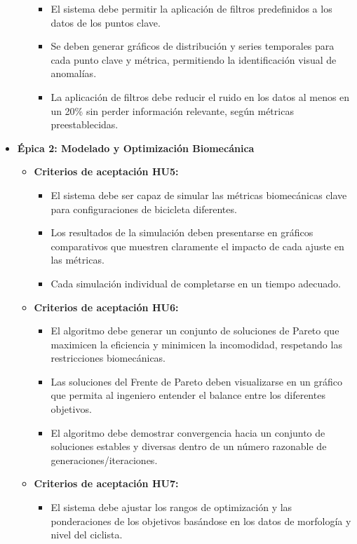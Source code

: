 \documentclass[
11pt, %
]{charter}
\begin{document}
\begin{itemize}
\begin{itemize}
\begin{itemize}
          \item El sistema debe permitir la aplicación de filtros predefinidos a los datos de los puntos clave. 
          \item Se deben generar gráficos de distribución y series temporales para cada punto clave y métrica, permitiendo la identificación visual de anomalías.
          \item La aplicación de filtros debe reducir el ruido en los datos al menos en un 20\% sin perder información relevante, según métricas preestablecidas.
        \end{itemize}
    \end{itemize}
  \item \textbf{Épica 2: Modelado y Optimización Biomecánica}
    \begin{itemize}
      \item \textbf{Criterios de aceptación HU5:}
        \begin{itemize}
          \item El sistema debe ser capaz de simular las métricas biomecánicas clave para configuraciones de bicicleta diferentes.
          \item Los resultados de la simulación deben presentarse en gráficos comparativos que muestren claramente el impacto de cada ajuste en las métricas.
          \item Cada simulación individual de completarse en un tiempo adecuado.
        \end{itemize}
      \item \textbf{Criterios de aceptación HU6:}
        \begin{itemize}
          \item El algoritmo debe generar un conjunto de soluciones de Pareto que maximicen la eficiencia y minimicen la incomodidad, respetando las restricciones biomecánicas.
          \item Las soluciones del Frente de Pareto deben visualizarse en un gráfico que permita al ingeniero entender el balance entre los diferentes objetivos. 
          \item El algoritmo debe demostrar convergencia hacia un conjunto de soluciones estables y diversas dentro de un número razonable de generaciones/iteraciones.
        \end{itemize}
      \item \textbf{Criterios de aceptación HU7:} 
        \begin{itemize}
          \item El sistema debe ajustar los rangos de optimización y las ponderaciones de los objetivos basándose en los datos de morfología y nivel del ciclista.

\end{itemize}
\end{itemize}
\end{itemize}
\end{document}
